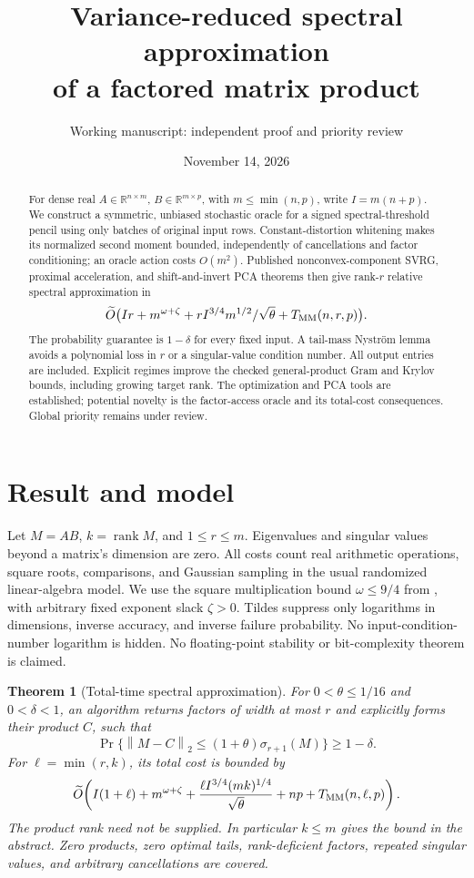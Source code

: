 \documentclass[11pt]{article}
\title{Variance-reduced spectral approximation\\of a factored matrix product}
\author{Working manuscript: independent proof and priority review}
\date{November 14, 2026}
\newtheorem{theorem}{Theorem}
\newcommand{\R}{\mathbb R}
\newcommand{\norm}[1]{\left\lVert#1\right\rVert}
\newcommand{\rank}{\operatorname{rank}}
\newcommand{\tO}{\widetilde O}
\newcommand{\MM}{T_{\rm MM}}
\begin{document}
\maketitle
\begin{abstract}
For dense real \(A\in\R^{n\times m}\), \(B\in\R^{m\times p}\), with
\(m\leq\min(n,p)\), write \(I=m(n+p)\). We construct a symmetric,
unbiased stochastic oracle for a signed spectral-threshold pencil using
only batches of original input rows. Constant-distortion whitening makes
its normalized second moment bounded, independently of cancellations
and factor conditioning; an oracle action costs \(O(m^2)\).
Published nonconvex-component SVRG, proximal acceleration, and
shift-and-invert PCA theorems then give rank-\(r\) relative spectral
approximation in
\[
 \tO\bigl(Ir+m^{\omega+\zeta}
            +r I^{3/4}m^{1/2}/\sqrt\theta+\MM(n,r,p)\bigr).
\]
The probability guarantee is \(1-\delta\) for every fixed input.
A tail-mass Nystr\"om lemma avoids a polynomial loss in \(r\) or a
singular-value condition number. All output entries are included.
Explicit regimes improve the checked general-product Gram and Krylov
bounds, including growing target rank. The optimization and PCA tools
are established; potential novelty is the factor-access oracle and its
total-cost consequences. Global priority remains under review.
\end{abstract}

\section{Result and model}
Let \(M=AB\), \(k=\rank M\), and \(1\leq r\leq m\).
Eigenvalues and singular values beyond a matrix's dimension are zero.
All costs count real arithmetic operations, square roots, comparisons,
and Gaussian sampling in the usual randomized linear-algebra model.
We use the square multiplication bound \(\omega\leq9/4\) from
\cite{amanov}, with arbitrary fixed exponent slack \(\zeta>0\).
Tildes suppress only logarithms in dimensions, inverse accuracy, and
inverse failure probability. No input-condition-number logarithm is hidden.
No floating-point stability or bit-complexity theorem is claimed.

\begin{theorem}[Total-time spectral approximation]\label{thm:main}
For \(0<\theta\leq1/16\) and \(0<\delta<1\), an algorithm returns
factors of width at most \(r\) and explicitly forms their product \(C\),
such that
\[
 \Pr\{\norm{M-C}_2\leq(1+\theta)\sigma_{r+1}(M)\}\geq1-\delta .
\]
For \(\ell=\min(r,k)\), its total cost is bounded by
\begin{equation}\label{eq:main}
 \tO\!\left(I(1+\ell)+m^{\omega+\zeta}
    +\frac{\ell I^{3/4}(mk)^{1/4}}{\sqrt\theta}
    +np+\MM(n,\ell,p)\right).
\end{equation}
The product rank need not be supplied. In particular \(k\leq m\)
gives the bound in the abstract. Zero products, zero optimal tails,
rank-deficient factors, repeated singular values, and arbitrary
cancellations are covered.
\end{theorem}
\end{document}
